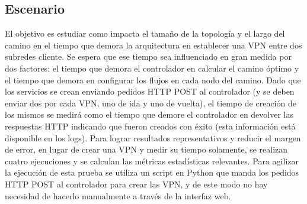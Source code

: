 \subsection{Escenario}
El objetivo es estudiar como impacta el tamaño de la topología y el largo del camino en el tiempo que demora la arquitectura en establecer una VPN entre dos subredes cliente. Se espera que ese tiempo sea influenciado en gran medida por dos factores: el tiempo que demora el controlador en calcular el camino óptimo y el tiempo que demora en configurar los flujos en cada nodo del camino. Dado que los servicios se crean enviando pedidos HTTP POST al controlador (y se deben enviar dos por cada VPN, uno de ida y uno de vuelta), el tiempo de creación de los mismos se medirá como el tiempo que demore el controlador en devolver las respuestas HTTP indicando que fueron creados con éxito (esta información está disponible en los logs). Para lograr resultados representativos y reducir el margen de error, en lugar de crear una VPN y medir su tiempo solamente, se realizan cuatro ejecuciones y se calculan las métricas estadísticas relevantes. Para agilizar la ejecución de esta prueba se utiliza un script en Python que manda los pedidos HTTP POST al controlador para crear las VPN, y de este modo no hay necesidad de hacerlo manualmente a través de la interfaz web.

